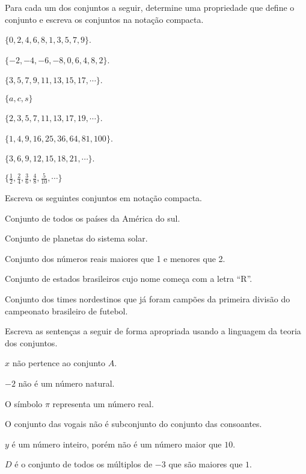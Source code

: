 \begin{questao}\label{test:Conjuntos1}
	Para cada um dos conjuntos a seguir, determine uma propriedade que define o conjunto e escreva os conjuntos na notação compacta.
\end{questao}

\begin{exerList}
	\item $\{0,2,4,6,8,1,3,5,7,9\}$.
	\item $\{-2, -4, -6, -8, 0, 6, 4, 8, 2\}$.
	\item $\{3, 5, 7, 9, 11, 13, 15, 17, \cdots\}$.
	\item $\{a, c, s\}$
	\item $\{2, 3, 5, 7, 11, 13, 17, 19, \cdots\}$.
	\item $\{1, 4, 9, 16, 25, 36, 64, 81, 100\}$.
	\item $\{3, 6, 9, 12, 15, 18, 21, \cdots\}$.
	\item $\Big\{\frac{1}{2}, \frac{2}{4}, \frac{3}{6}, \frac{4}{8}, \frac{5}{10}, \cdots\Big\}$
\end{exerList}

\begin{questao}\label{test:Conjuntos2}
	Escreva os seguintes conjuntos em notação compacta.
\end{questao}

\begin{exerList}
	\item Conjunto de todos os países da América do sul.
	\item Conjunto de planetas do sistema solar.
	\item Conjunto dos números reais maiores que 1 e menores que 2.
	\item Conjunto de estados brasileiros cujo nome começa com a letra ``R''.
	\item Conjunto dos times nordestinos que já foram campões da primeira divisão do campeonato brasileiro de futebol.
\end{exerList}


\begin{questao}\label{test:Conjuntos3}
	Escreva as sentenças a seguir de forma apropriada usando a linguagem da teoria dos conjuntos.
\end{questao}

\begin{exerList}
	\item $x$ não pertence ao conjunto $A$.
	\item $-2$ não é um número natural.
	\item O símbolo $\pi$ representa um número real.
	\item O conjunto das vogais não é subconjunto do conjunto das consoantes.
	\item $y$ é um número inteiro, porém não é um número maior que $10$.
	\item $D$ é o conjunto de todos os múltiplos de $-3$ que são maiores que $1$.
\end{exerList}

